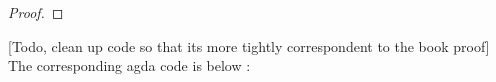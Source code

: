 \documentclass[11pt, a4paper]{article}
\newtheorem{proof}{Proof}
\newcommand{\jdeq}{\equiv}      %
\newcommand{\refl}[1]{\ensuremath{\mathsf{refl}_{#1}}\xspace}
\newcommand{\defeq}{\vcentcolon\equiv}  %
\newcommand{\opp}[1]{\mathord{{#1}^{-1}}}
\begin{document}
\begin{proof}
\end{proof}


[Todo, clean up code so that its more tightly correspondent to the book proof]
The corresponding agda code is below :
\end{document}
